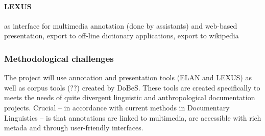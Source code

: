 \documentclass[a4paper,12pt]{article}
\begin{document}



\paragraph{LEXUS} as interface for multimedia annotation (done by assistants) and web-based presentation, export to off-line dictionary applications, export to wikipedia

\subsubsection{Methodological challenges}%
The project will use annotation and presentation tools (ELAN and LEXUS) as well as corpus tools (??) created by DoBeS. These tools are created specifically to meets the needs of quite divergent linguistic and anthropological documentation projects. Crucial – in accordance with current methods in Documentary Linguistics – is that annotations are linked to multimedia, are accessible with rich metada and through user-friendly interfaces.
\end{document}
